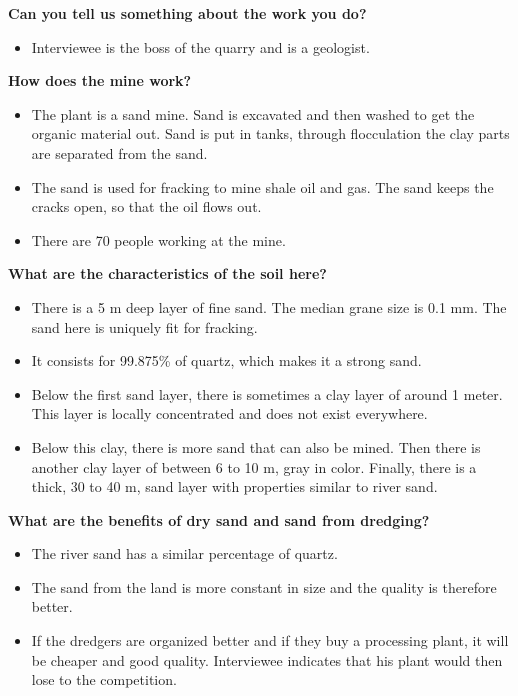 \textbf{Can you tell us something about the work you do?}
\begin{itemize}
    \item Interviewee is the boss of the quarry and is a geologist.
\end{itemize}

\textbf{How does the mine work?}
\begin{itemize}
    \item The plant is a sand mine. Sand is excavated and then washed to get the organic material out. Sand is put in tanks, through flocculation the clay parts are separated from the sand.
    \item The sand is used for fracking to mine shale oil and gas. The sand keeps the cracks open, so that the oil flows out.
    \item There are 70 people working at the mine.
\end{itemize}

\textbf{What are the characteristics of the soil here?}
\begin{itemize}
    \item There is a 5 m deep layer of fine sand. The median grane size is 0.1 mm. The sand here is uniquely fit for fracking.
    \item It consists for 99.875\% of quartz, which makes it a strong sand.
    \item Below the first sand layer, there is sometimes a clay layer of around 1 meter. This layer is locally concentrated and does not exist everywhere.
    \item Below this clay, there is more sand that can also be mined. Then there is another clay layer of between 6 to 10 m, gray in color. Finally, there is a thick, 30 to 40 m, sand layer with properties similar to river sand.
\end{itemize}

\textbf{What are the benefits of dry sand and sand from dredging?}
\begin{itemize}
    \item The river sand has a similar percentage of quartz.
    \item The sand from the land is more constant in size and the quality is therefore better.
    \item If the dredgers are organized better and if they buy a processing plant, it will be cheaper and good quality. Interviewee indicates that his plant would then lose to the competition.
\end{itemize}

